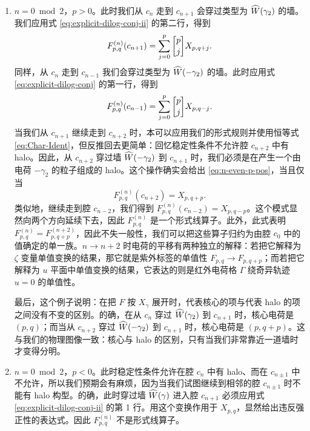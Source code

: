\begin{enumerate}

\item $n=0\bmod 2$，$p>0$。此时我们从 $c_n$ 走到 $c_{n+1}$ 会穿过类型为 $\widehat W(\gamma_2)$ 的墙。我们应用式 \eqref{eq:explicit-dilog-conj-ii} 的第二行，得到
\begin{equation}\label{eq:n-even-p-pos}
F^{(n)}_{p,q}(c_{n+1}) = \sum_{j=0}^p \qbinom{p}{j} X_{p,q+j}.
\end{equation}
同样，从 $c_n$ 走到 $c_{n-1}$ 我们会穿过类型为 $\widehat W(-\gamma_2)$ 的墙。此时应用式 \eqref{eq:explicit-dilog-conj} 的第一行，得到
\begin{equation}
F^{(n)}_{p,q}(c_{n-1}) = \sum_{j=0}^p \qbinom{p}{j} X_{p,q-j}.
\end{equation}
当我们从 $c_{n+1}$ 继续走到 $c_{n+2}$ 时，本可以应用我们的形式规则并使用恒等式 \eqref{eq:Char-Ident}，但反推回去更简单：回忆稳定性条件不允许腔 $c_{n+2}$ 中有 halo。因此，从 $c_{n+2}$ 穿过墙 $\widehat W(-\gamma_2)$ 到 $c_{n+1}$ 时，我们必须是在产生一个由电荷 $-\gamma_2$ 的粒子组成的 halo。这个操作确实会给出 \eqref{eq:n-even-p-pos}，当且仅当
\begin{equation}\label{eq:u1-monod}
F^{(n)}_{p,q}(c_{n+2}) = X_{p,q+p}.
\end{equation}
类似地，继续走到腔 $c_{n-2}$，我们得到 $F^{(n)}_{p,q}(c_{n-2})=X_{p,q-p}$。这个模式显然向两个方向延续下去，因此 $F^{(n)}_{p,q}$ 是一个形式线算子。此外，此式表明 $F^{(n)}_{p,q} = F^{(n+2)}_{p,q+p}$，因此不失一般性，我们可以把这些算子归约为由腔 $c_0$ 中的值确定的单一族。$n\to n+2$ 时电荷的平移有两种独立的解释：若把它解释为 $\zeta$ 变量单值变换的结果，那它就是紫外标签的单值性 $F_{p,q}\to F_{p,q+p}$；而若把它解释为 $u$ 平面中单值变换的结果，它表达的则是红外电荷格 $\Gamma$ 绕奇异轨迹 $u=0$ 的单值性。

最后，这个例子说明：在把 $F$ 按 $X_\gamma$ 展开时，代表核心的项与代表 halo 的项之间没有不变的区别。的确，在从 $c_n$ 穿过 $\widehat W(\gamma_2)$ 到 $c_{n+1}$ 时，核心电荷是 $(p,q)$；而当从 $c_{n+2}$ 穿过 $\widehat W(-\gamma_2)$ 到 $c_{n+1}$ 时，核心电荷是 $(p,q+p)$。这与我们的物理图像一致：核心与 halo 的区别，只有当我们非常靠近一道墙时才变得分明。

\item $n=0\bmod 2$，$p<0$。此时稳定性条件允许在腔 $c_n$ 中有 halo、而在 $c_{n\pm1}$ 中不允许，所以我们预期会有麻烦，因为当我们试图继续到相邻的腔 $c_{n\pm1}$ 时不能有 halo 构型。的确，此时穿过墙 $\widehat W(\gamma)$ 进入腔 $c_{n+1}$ 必须应用式 \eqref{eq:explicit-dilog-conj-ii} 的第 1 行。用这个变换作用于 $X_{p,q}$，显然给出违反强正性的表达式。因此 $F^{(n)}_{p,q}$ 不是形式线算子。


\end{enumerate}
